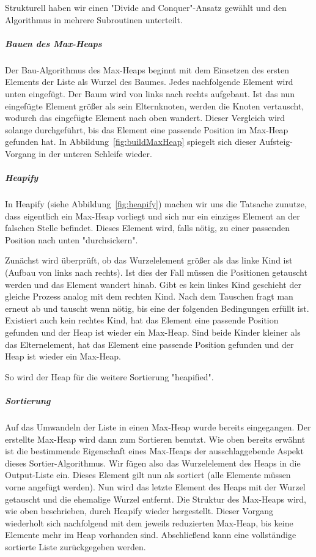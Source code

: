 \documentclass[11pt]{article}
\begin{document}
    Strukturell haben wir einen "Divide and Conquer"-Ansatz gewählt und den
    Algorithmus in mehrere Subroutinen unterteilt.

    \subparagraph{Bauen des Max-Heaps}
    Der Bau-Algorithmus des Max-Heaps beginnt mit dem Einsetzen des ersten
    Elements der Liste als Wurzel des Baumes.
    Jedes nachfolgende Element wird unten eingefügt. Der Baum wird von links
    nach rechts aufgebaut.
    Ist das nun eingefügte Element größer als sein Elternknoten, werden die
    Knoten vertauscht, wodurch das eingefügte Element nach oben wandert.
    Dieser Vergleich wird solange durchgeführt, bis das Element eine passende
    Position im Max-Heap gefunden hat.
    In Abbildung~\ref{fig:buildMaxHeap} spiegelt sich dieser Aufsteig-Vorgang
    in der unteren Schleife wieder.

    \subparagraph{Heapify}
    In Heapify (siehe Abbildung~\ref{fig:heapify}) machen wir uns die
    Tatsache zunutze, dass eigentlich ein
    Max-Heap vorliegt und sich nur ein einziges Element an der falschen
    Stelle befindet.
    Dieses Element wird, falls nötig, zu einer passenden Position nach unten
    "durchsickern".

    Zunächst wird überprüft, ob das Wurzelelement größer als das linke Kind
    ist (Aufbau von links nach rechts).
    Ist dies der Fall müssen die Positionen getauscht werden und das Element
    wandert hinab.
    Gibt es kein linkes Kind geschieht der gleiche Prozess analog mit dem
    rechten Kind.
    Nach dem Tauschen fragt man erneut ab und tauscht wenn nötig, bis eine
    der folgenden Bedingungen erfüllt ist.
    Existiert auch kein rechtes Kind, hat das Element eine passende Position
    gefunden und der Heap ist wieder ein Max-Heap.
    Sind beide Kinder kleiner als das Elternelement, hat das Element eine
    passende Position gefunden und der Heap ist wieder ein Max-Heap.

    So wird der Heap für die weitere Sortierung "heapified".

    \subparagraph{Sortierung}
    Auf das Umwandeln der Liste in einen Max-Heap wurde bereits eingegangen.
    Der erstellte Max-Heap wird dann zum Sortieren benutzt.
    Wie oben bereits erwähnt ist die bestimmende Eigenschaft eines Max-Heaps
    der ausschlaggebende Aspekt dieses Sortier-Algorithmus.
    Wir fügen also das Wurzelelement des Heaps in die Output-Liste ein.
    Dieses Element gilt nun als sortiert (alle Elemente müssen vorne angefügt
    werden).
    Nun wird das letzte Element des Heaps mit der Wurzel getauscht und die
    ehemalige Wurzel entfernt.
    Die Struktur des Max-Heaps wird, wie oben beschrieben, durch Heapify
    wieder hergestellt.
    Dieser Vorgang wiederholt sich nachfolgend mit dem jeweils reduzierten
    Max-Heap, bis keine Elemente mehr im Heap vorhanden sind.
    Abschließend kann eine vollständige sortierte Liste zurückgegeben werden.
\end{document}

